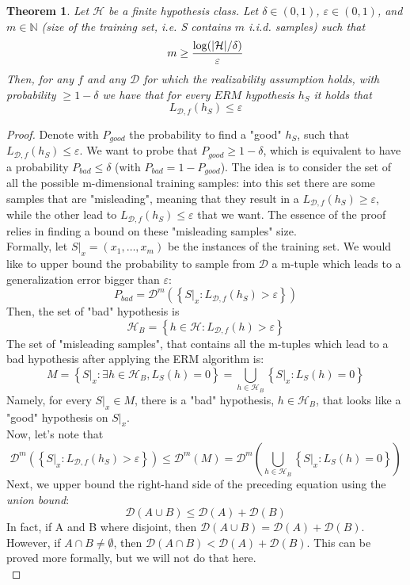 \documentclass[12pt]{report}
\theoremstyle{plain}
\newtheorem{THEO}{Theorem}
\newcommand\mcl[1]{\mathcal{#1}}
\begin{document}
\begin{flushleft}
\vspace{0.5cm}
\begin{THEO}
Let $\mcl{H}$ be a finite hypothesis class. Let $\delta\in (0,1)$, $\varepsilon\in (0,1)$, and $m\in\mathds{N}$ (size of the training set, i.e. S contains $m$ i.i.d. samples) such that
\[ m\geq\frac{\log (\abs{\mcl{H}}/\delta)}{\varepsilon} \]
Then, for any $f$ and any $\mcl{D}$ for which the realizability assumption holds, with probability $\geq 1-\delta$ we have that for every $ERM$ hypothesis $h_S$ it holds that 
\[ L_{\mcl{D},f}(h_S)\leq\varepsilon \] 
\end{THEO}
\begin{proof}
	Denote with $P_{good}$ the probability to find a "good" $h_S$, such that $L_{\mcl{D},f}(h_S)\leq\varepsilon$. We want to probe that $P_{good}\geq 1-\delta$, which is equivalent to have a probability $P_{bad}\leq\delta$ (with $P_{bad}=1-P_{good}$). The idea is to consider the set of all the possible m-dimensional training samples: into this set there are some samples that are "misleading", meaning that they result in a $L_{\mcl{D},f}(h_S)\geq\varepsilon$, while the other lead to $L_{\mcl{D},f}(h_S)\leq\varepsilon$ that we want. The essence of the proof relies in finding a bound on these "misleading samples" size.\\
	Formally, let $S|_x=(x_1,\dots,x_m)$ be the instances of the training set. We would like to upper bound the probability to sample from $\mcl{D}$ a m-tuple which leads to a generalization error bigger than $\varepsilon$:
	\[ P_{bad}=\mcl{D}^m(\left\{S|_x:L_{\mcl{D},f}(h_S)>\varepsilon\right\}) \]  
	Then, the set of "bad" hypothesis is
	\[ \mcl{H}_B=\left\{h\in\mcl{H}:L_{\mcl{D},f}(h)>\varepsilon\right\} \]
	The set of "misleading samples", that contains all the m-tuples which lead to a bad hypothesis after applying the ERM algorithm is:
	\[ M=\left\{S|_x:\exists h\in\mcl{H}_B,L_S(h)=0 \right\} = \underset{h\in\mcl{H}_B}{\bigcup}\left\{S|_x:L_S(h)=0\right\} \]
	Namely, for every $S|_x\in M$, there is a "bad" hypothesis, $h\in\mcl{H}_B$, that looks like a "good" hypothesis on $S|_x$.\\
	Now, let's note that
	\[ \mcl{D}^m\left(\left\{ S|_x:L_{\mcl{D},f}(h_S)>\varepsilon \right\}\right)\leq\mcl{D}^m(M)=\mcl{D}^m\left( \underset{h\in\mcl{H}_B}{\bigcup}\left\{S|_x:L_S(h)=0\right\} \right) \]
	Next, we upper bound the right-hand side of the preceding equation using the \textit{union bound}:
	\[ \mcl{D}(A\cup B)\leq \mcl{D}(A)+\mcl{D}(B) \]
	In fact, if A and B where disjoint, then $\mcl{D}(A\cup B) = \mcl{D}(A) + \mcl{D}(B)$. However, if $A\cap B\neq\emptyset$, then $\mcl{D}(A\cap B) < \mcl{D}(A) + \mcl{D}(B)$. This can be proved more formally, but we will not do that here.\\

\end{proof}
\end{flushleft}
\end{document}
